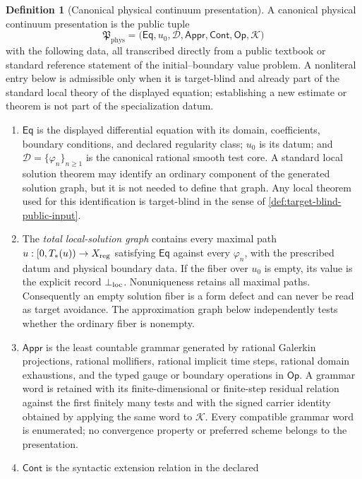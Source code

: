 \documentclass[11pt]{article}
\numberwithin{section}{part}
\theoremstyle{plain}
\theoremstyle{definition}
\newtheorem{definition}[definition]{Definition}
\theoremstyle{remark}
\newcommand{\Phys}{\mathrm{phys}}
\begin{document}
\begin{definition}[Canonical physical continuum presentation]
\label{def:physical-presentation}
A canonical physical continuum presentation is the public tuple
\[
 \mathfrak P_{\Phys}
 =\bigl(\mathsf{Eq},u_0,\mathcal D,\mathsf{Appr},\mathsf{Cont},
        \mathsf{Op},\mathcal K\bigr)
\]
with the following data, all transcribed directly from a public textbook or
standard reference statement of the initial--boundary value problem.  A
nonliteral entry below is admissible only when it is target-blind and already
part of the standard local theory of the displayed equation; establishing a
new estimate or theorem is not part of the specialization datum.
\begin{enumerate}[label=\textup{(P\arabic*)}]
\item \(\mathsf{Eq}\) is the displayed differential equation with its domain,
coefficients, boundary conditions, and declared regularity class;
\(u_0\) is its datum; and
\(\mathcal D=\{\varphi_n\}_{n\ge1}\) is the canonical rational smooth test
core.  A standard local solution theorem may identify an ordinary component
of the generated solution graph, but it is not needed to define that graph.
Any local theorem used for this identification is target-blind in the sense
of \cref{def:target-blind-public-input}.
\item The \emph{total local-solution graph} contains every maximal path
\(u:[0,T_*(u))\to X_{\rm reg}\) satisfying \(\mathsf{Eq}\) against every
\(\varphi_n\), with the prescribed datum and physical boundary data.  If the
fiber over \(u_0\) is empty, its value is the explicit record
\(\bot_{\rm loc}\).  Nonuniqueness retains all maximal paths.  Consequently an
empty solution fiber is a form defect and can never be read as target
avoidance.  The approximation graph below independently tests whether the
ordinary fiber is nonempty.
\item \(\mathsf{Appr}\) is the least countable grammar generated by rational
Galerkin projections, rational mollifiers, rational implicit time steps,
rational domain exhaustions, and the typed gauge or boundary operations in
\(\mathsf{Op}\).  A grammar word is retained with its finite-dimensional or
finite-step residual relation against the first finitely many tests and with
the signed carrier identity obtained by applying the same word to
\(\mathcal K\).  Every compatible grammar word is enumerated; no convergence
property or preferred scheme belongs to the presentation.
\item \(\mathsf{Cont}\) is the syntactic extension relation in the declared

\end{enumerate}
\end{definition}
\end{document}
